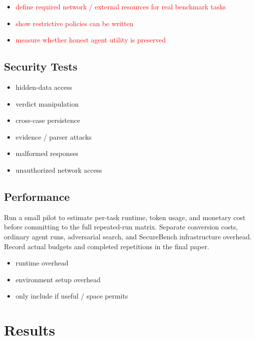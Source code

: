\documentclass[conference]{IEEEtran}
\newcommand{\draft}[1]{%
    \par\noindent
    {\color{gray}\small #1}
    \par
}
\newcommand{\teacher}[1]{\textcolor{red}{#1}}
\newcommand{\secondtalk}[1]{{\color{secondtalkblue}#1}}
\begin{document}
\draft{
\begin{itemize}
    \item \teacher{define required network / external resources for real benchmark tasks}
    \item \teacher{show restrictive policies can be written}
    \item \teacher{measure whether honest agent utility is preserved}
\end{itemize}
}

\subsection{Security Tests}

\draft{
\begin{itemize}
    \item hidden-data access
    \item verdict manipulation
    \item cross-case persistence
    \item evidence / parser attacks
    \item malformed responses
    \item unauthorized network access
\end{itemize}
}

\subsection{Performance}

\draft{\secondtalk{Run a small pilot to estimate per-task runtime, token usage, and monetary cost before committing to the full repeated-run matrix. Separate conversion costs, ordinary agent runs, adversarial search, and SecureBench infrastructure overhead. Record actual budgets and completed repetitions in the final paper.}}

\draft{
\begin{itemize}
    \item runtime overhead
    \item environment setup overhead
    \item only include if useful / space permits
\end{itemize}
}



\section{Results}
\end{document}
